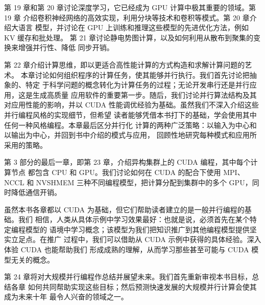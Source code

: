 第 19 章和第 20 章讨论深度学习，它已经成为 GPU 计算中极其重要的领域。第 19 章
介绍卷积神经网络的高效实现，利用分块等技术和卷积等模式。第 20 章介绍大语言
模型，并讨论在 GPU 上训练和推理这些模型的先进优化方法，例如 KV 缓存和批处理。
第 21 章讨论静电势图计算，以及如何利用从散布到聚集的变换来增强并行性、降低
同步开销。

第 22 章介绍计算思维，即以更适合高性能计算的方式构造和求解计算问题的艺术。
本章讨论如何组织程序的计算任务，使其能够并行执行。我们首先讨论把抽象的、特定
于科学问题的概念转化为计算任务的过程；无论开发串行还是并行应用，这是生成高质量
应用软件的重要第一步。随后，我们讨论并行算法结构及其对应用性能的影响，并以
CUDA 性能调优经验为基础。虽然我们不深入介绍这些并行编程风格的实现细节，但希望
读者能够凭借本书打下的基础，学会使用其中任何一种风格编程。本章最后区分并行化
计算的两种广泛策略：以输入为中心和以输出为中心，并回到书中介绍的模式与应用，
回顾性地研究每种模式和应用所采用的策略。

第 3 部分的最后一章，即第 23 章，介绍异构集群上的 CUDA 编程，其中每个计算节点
都包含 CPU 和 GPU。我们讨论如何在 CUDA 的配合下使用 MPI、NCCL 和 NVSHMEM
三种不同编程模型，把计算分配到集群中的多个 GPU，同时降低通信开销。

虽然本书各章都以 CUDA 为基础，但它们帮助读者建立的是一般并行编程的基础。我们
相信，人类从具体示例中学习效果最好：也就是说，必须首先在某个特定编程模型的
语境中学习概念；该模型为我们把知识推广到其他编程模型提供坚实立足点。在推广
过程中，我们可以借助从 CUDA 示例中获得的具体经验。深入体验 CUDA 也能帮助我们
形成成熟的理解，从而学习那些甚至可能与 CUDA 模型无关的概念。

第 24 章将对大规模并行编程作总结并展望未来。我们首先重新审视本书目标，总结各章
如何共同帮助实现这些目标；然后预测快速发展的大规模并行计算会使其成为未来十年
最令人兴奋的领域之一。

